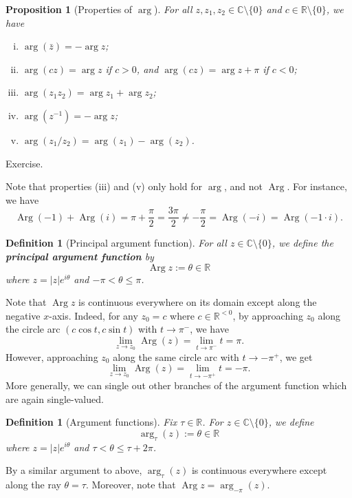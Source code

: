 \documentclass[10pt]{article}
\makeatletter
\newcommand{\R}{\mathbb{R}}
\newcommand{\C}{\mathbb{C}}
\DeclareMathOperator{\Arg}{Arg}
\theoremstyle{newstyle}
\newtheorem{prop}[thm]{Proposition}
\newtheorem{defn}[thm]{Definition}
\newenvironment{pf}[1][\proofname]{\par
  \pushQED{\qed}%
  \normalfont \topsep0\p@\relax
  \trivlist
  \item[\hskip\labelsep\scshape
  #1\@addpunct{.}]\ignorespaces
}{%
  \popQED\endtrivlist\@endpefalse
}
\makeatother
\begin{document}
\begin{prop}[Properties of $\arg$]
For all $z, z_1, z_2 \in \C \setminus \{0\}$ and $c \in \R \setminus \{0\}$, we have 
\begin{enumerate}[(i)]
    \item $\arg(\bar z) = -\arg z$;
    \item $\arg(cz) = \arg z$ if $c > 0$, and $\arg(cz) = \arg z + \pi$ if $c < 0$;
    \item $\arg(z_1z_2) = \arg z_1 + \arg z_2$;
    \item $\arg(z^{-1}) = -\arg z$;
    \item $\arg(z_1/z_2) = \arg(z_1) - \arg(z_2)$.
\end{enumerate}
\end{prop}
\begin{pf}
Exercise. 
\end{pf}

Note that properties (iii) and (v) only hold for $\arg$, and not $\Arg$. For instance, we have 
\[ \Arg(-1) + \Arg(i) = \pi + \frac{\pi}2 = \frac{3\pi}2 \neq -\frac\pi2 = \Arg(-i) = \Arg(-1 \cdot i). \]

\begin{defn}[Principal argument function]
For all $z \in \C \setminus \{0\}$, we define the {\bf principal argument function} by 
\[ \Arg z := \theta \in \R \]
where $z = |z|e^{i\theta}$ and $-\pi < \theta \leq \pi$. 
\end{defn}

Note that $\Arg z$ is continuous everywhere on its domain except along the negative $x$-axis. 
Indeed, for any $z_0 = c$ where $c \in \R^{<0}$, by approaching $z_0$ along the circle arc 
$(c \cos t, c \sin t)$ with $t \to \pi^-$, we have 
\[ \lim_{z\to z_0} \Arg(z) = \lim_{t \to \pi^-} t = \pi. \]
However, approaching $z_0$ along the same circle arc with $t \to -\pi^+$, we get 
\[ \lim_{z\to z_0} \Arg(z) = \lim_{t \to -\pi^+} t = -\pi. \]
More generally, we can single out other branches of the argument function which are again single-valued. 

\begin{defn}[Argument functions]
Fix $\tau \in \R$. For $z \in \C \setminus \{0\}$, we define 
\[ \arg_\tau(z) := \theta \in \R \]
where $z = |z|e^{i\theta}$ and $\tau < \theta \leq \tau+2\pi$. 
\end{defn}

By a similar argument to above, $\arg_\tau(z)$ is continuous everywhere except along the 
ray $\theta = \tau$. Moreover, note that $\Arg z = \arg_{-\pi}(z)$. 
\end{document}
